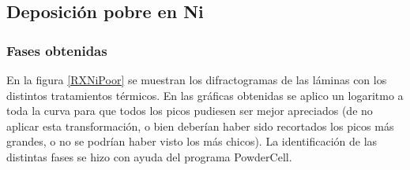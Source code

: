 \documentclass[12pt]{article}
\theoremstyle{definition}
\theoremstyle{remark}
\begin{document}
\subsection{Deposición pobre en Ni}
\subsubsection{Fases obtenidas}
En la figura \ref{RXNiPoor} se muestran los difractogramas de las láminas con los distintos tratamientos térmicos. En las gráficas obtenidas se aplico un logaritmo a toda la curva para que todos los picos pudiesen ser mejor apreciados (de no aplicar esta transformación, o bien deberían haber sido recortados los picos más grandes, o no se podrían haber visto los más chicos). La identificación de las distintas fases se hizo con ayuda del programa PowderCell.
\end{document}
